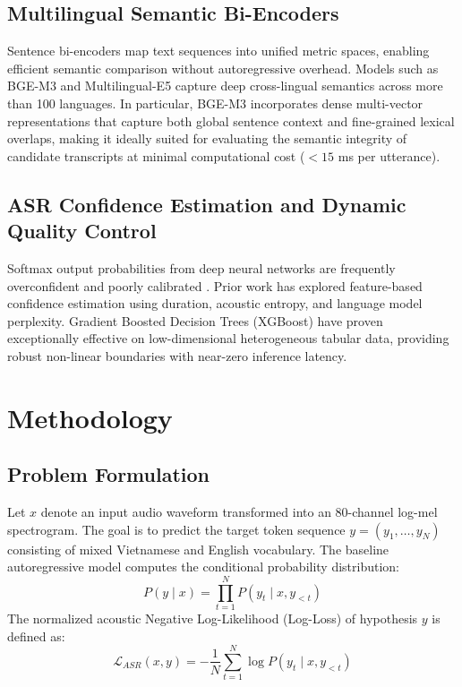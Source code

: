 \documentclass[9pt, conference, a4paper, compsocconf]{IEEEtran}
\begin{document}
\subsection{Multilingual Semantic Bi-Encoders}
Sentence bi-encoders map text sequences into unified metric spaces, enabling efficient semantic comparison without autoregressive overhead. Models such as BGE-M3 \cite{chen2024bge} and Multilingual-E5 \cite{wang2024multilingual} capture deep cross-lingual semantics across more than 100 languages. In particular, BGE-M3 incorporates dense multi-vector representations that capture both global sentence context and fine-grained lexical overlaps, making it ideally suited for evaluating the semantic integrity of candidate transcripts at minimal computational cost ($< 15$ ms per utterance).

\subsection{ASR Confidence Estimation and Dynamic Quality Control}
Softmax output probabilities from deep neural networks are frequently overconfident and poorly calibrated \cite{guo2017calibration, larson2022calibrating}. Prior work has explored feature-based confidence estimation using duration, acoustic entropy, and language model perplexity. Gradient Boosted Decision Trees (XGBoost) \cite{chen2016xgboost} have proven exceptionally effective on low-dimensional heterogeneous tabular data, providing robust non-linear boundaries with near-zero inference latency.

\section{Methodology}

\subsection{Problem Formulation}
Let $x$ denote an input audio waveform transformed into an 80-channel log-mel spectrogram. The goal is to predict the target token sequence $y = (y_1, \dots, y_N)$ consisting of mixed Vietnamese and English vocabulary. The baseline autoregressive model computes the conditional probability distribution:
\begin{equation}
P(y \mid x) = \prod_{t=1}^N P(y_t \mid x, y_{<t})
\end{equation}
The normalized acoustic Negative Log-Likelihood (Log-Loss) of hypothesis $y$ is defined as:
\begin{equation}
\mathcal{L}_{ASR}(x, y) = -\frac{1}{N} \sum_{t=1}^N \log P(y_t \mid x, y_{<t})
\end{equation}
\end{document}
